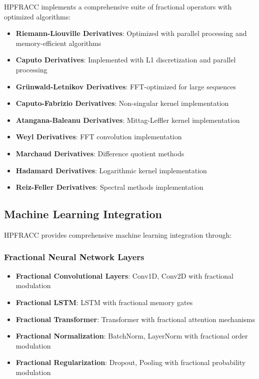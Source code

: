 \documentclass[12pt]{article}
\begin{document}
HPFRACC implements a comprehensive suite of fractional operators with optimized algorithms:

\begin{itemize}
\item \textbf{Riemann-Liouville Derivatives}: Optimized with parallel processing and memory-efficient algorithms
\item \textbf{Caputo Derivatives}: Implemented with L1 discretization and parallel processing
\item \textbf{Grünwald-Letnikov Derivatives}: FFT-optimized for large sequences
\item \textbf{Caputo-Fabrizio Derivatives}: Non-singular kernel implementation
\item \textbf{Atangana-Baleanu Derivatives}: Mittag-Leffler kernel implementation
\item \textbf{Weyl Derivatives}: FFT convolution implementation
\item \textbf{Marchaud Derivatives}: Difference quotient methods
\item \textbf{Hadamard Derivatives}: Logarithmic kernel implementation
\item \textbf{Reiz-Feller Derivatives}: Spectral methods implementation
\end{itemize}

\subsection{Machine Learning Integration}

HPFRACC provides comprehensive machine learning integration through:

\subsubsection{Fractional Neural Network Layers}

\begin{itemize}
\item \textbf{Fractional Convolutional Layers}: Conv1D, Conv2D with fractional modulation
\item \textbf{Fractional LSTM}: LSTM with fractional memory gates
\item \textbf{Fractional Transformer}: Transformer with fractional attention mechanisms
\item \textbf{Fractional Normalization}: BatchNorm, LayerNorm with fractional order modulation
\item \textbf{Fractional Regularization}: Dropout, Pooling with fractional probability modulation
\end{itemize}
\end{document}
